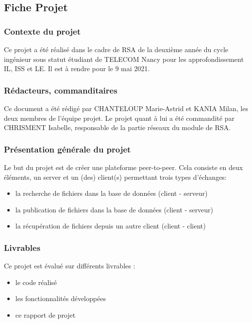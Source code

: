 
\subsection{Fiche Projet}
\subsubsection{Contexte du projet}
Ce projet a été réalisé dans le cadre de RSA de la deuxième année du cycle ingénieur sous statut étudiant de TELECOM Nancy pour les approfondissement IL, ISS et LE. Il est à rendre pour le 9 mai 2021.

\subsubsection{Rédacteurs, commanditaires}
Ce document a été rédigé par CHANTELOUP Marie-Astrid et KANIA Milan, les deux membres de l'équipe projet. Le projet quant à lui a été commandité par CHRISMENT Isabelle, responsable de la partie réseaux du module de RSA.


\subsubsection{Présentation générale du projet}
Le but du projet est de créer une plateforme peer-to-peer. Cela consiste en deux éléments, un server et un (des) client(s) permettant trois types d'échanges:
\begin{itemize}
    \item la recherche de fichiers dans la base de données (client - serveur)
    \item la publication de fichiers dans la base de données (client - serveur)
    \item la récupération de fichiers depuis un autre client (client - client)
\end{itemize}


\subsubsection{Livrables}
Ce projet est évalué sur différents livrables :
\begin{itemize}
\item le code réalisé
\item les fonctionnalités développées
\item ce rapport de projet
\end{itemize}

